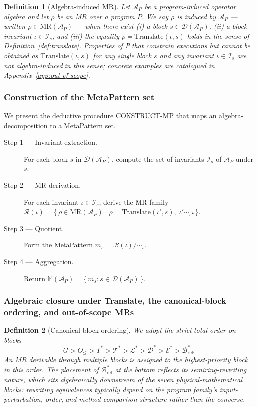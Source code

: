 \documentclass[acmsmall, screen]{acmart}
\newtheorem{definition}{Definition}
\begin{document}
\begin{definition}[Algebra-induced MR]
\label{def:alg-induced}
Let $\mathcal{A}_P$ be a program-induced operator algebra and let $\rho$ be an MR over a program $P$. We say $\rho$ is \emph{induced by $\mathcal{A}_P$} --- written $\rho \in \mathrm{MR}(\mathcal{A}_P)$ --- when there exist (i) a block $s \in \mathcal{D}(\mathcal{A}_P)$, (ii) a block invariant $\iota \in \mathcal{I}_s$, and (iii) the equality $\rho = \mathrm{Translate}(\iota, s)$ holds in the sense of Definition~\ref{def:translate}. Properties of $P$ that constrain executions but cannot be obtained as $\mathrm{Translate}(\iota, s)$ for any single block $s$ and any invariant $\iota \in \mathcal{I}_s$ are \emph{not} algebra-induced in this sense; concrete examples are catalogued in Appendix~\ref{app:out-of-scope}.
\end{definition}

\subsubsection{Construction of the MetaPattern set}

We present the deductive procedure CONSTRUCT-MP that maps an algebra-decomposition to a MetaPattern set.

\begin{description}
  \item[Step 1 --- Invariant extraction.] For each block $s$ in $\mathcal{D}(\mathcal{A}_P)$, compute the set of invariants $\mathcal{I}_s$ of $\mathcal{A}_P$ under $s$.
  \item[Step 2 --- MR derivation.] For each invariant $\iota \in \mathcal{I}_s$, derive the MR family $\mathcal{R}(\iota) = \{\,\rho \in \mathrm{MR}(\mathcal{A}_P) \mid \rho = \mathrm{Translate}(\iota', s),\; \iota' \sim_s \iota\,\}$.
  \item[Step 3 --- Quotient.] Form the MetaPattern $m_s = \mathcal{R}(\iota)/\!\sim_s$.
  \item[Step 4 --- Aggregation.] Return $\mathbb{M}(\mathcal{A}_P) = \{\, m_s : s \in \mathcal{D}(\mathcal{A}_P)\,\}$.
\end{description}

\subsubsection{Algebraic closure under Translate, the canonical-block ordering, and out-of-scope MRs}
\label{subsec:completeness}

\begin{definition}[Canonical-block ordering]
\label{def:canonical-order}
We adopt the strict total order on blocks
$$G > O_{\le} > T^{*} > \mathcal{T}^{*} > \mathcal{L}^{*} > \mathcal{D}^{*} > \mathcal{E}^{*} > \mathcal{B}^{*}_{\mathrm{rel}}.$$
An MR derivable through multiple blocks is assigned to the highest-priority block in this order. The placement of $\mathcal{B}^{*}_{\mathrm{rel}}$ at the bottom reflects its semiring-rewriting nature, which sits algebraically downstream of the seven physical-mathematical blocks: rewriting equivalences typically depend on the program family's input-perturbation, order, and method-comparison structure rather than the converse.
\end{definition}
\end{document}
